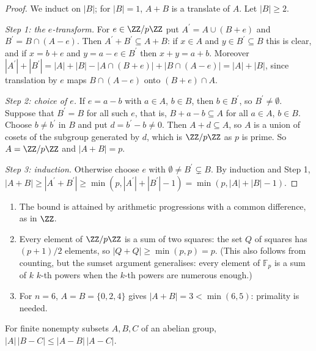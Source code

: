 \begin{proof}
We induct on $|B|$; for $|B| = 1$, $A + B$ is a translate of $A$. Let $|B| \geq 2$.

\emph{Step 1: the $e$-transform.} For $e \in \ZZ/p\ZZ$ put $A^{\prime} = A \cup (B + e)$ and $B^{\prime} = B \cap (A - e)$. Then $A^{\prime} + B^{\prime} \subseteq A + B$: if $x \in A$ and $y \in B^{\prime} \subseteq B$ this is clear, and if
$x = b + e$ and $y = a - e \in B^{\prime}$ then $x + y = a + b$. Moreover $|A^{\prime}| + |B^{\prime}| = |A| + |B| - |A \cap (B + e)| + |B \cap (A - e)| = |A| + |B|$, since translation by $e$ maps $B \cap (A - e)$ onto
$(B + e) \cap A$.

\emph{Step 2: choice of $e$.} If $e = a - b$ with $a \in A$, $b \in B$, then $b \in B^{\prime}$, so $B^{\prime} \neq \emptyset$. Suppose that $B^{\prime} = B$ for all such $e$, that is, $B + a - b \subseteq A$ for all $a \in A$, $b \in B$.
Choose $b \neq b^{\prime}$ in $B$ and put $d = b^{\prime} - b \neq 0$. Then $A + d \subseteq A$, so $A$ is a union of cosets of the subgroup generated by $d$, which is $\ZZ/p\ZZ$ as $p$ is prime. So $A = \ZZ/p\ZZ$
and $|A + B| = p$.

\emph{Step 3: induction.} Otherwise choose $e$ with $\emptyset \neq B^{\prime} \subsetneq B$. By induction and Step 1,
$|A + B| \geq |A^{\prime} + B^{\prime}| \geq \min(p, |A^{\prime}| + |B^{\prime}| - 1) = \min(p, |A| + |B| - 1)$.
\end{proof}

\begin{example}\label{additive-number-theory:example-cauchy-davenport}
\begin{enumerate}
\item The bound is attained by arithmetic progressions with a common difference, as in $\ZZ$.
\item Every element of $\ZZ/p\ZZ$ is a sum of two squares: the set $Q$ of squares has $(p + 1)/2$ elements, so $|Q + Q| \geq \min(p, p) = p$. (This also follows from counting, but the sumset argument
generalises: every element of $\mathbb{F}_p$ is a sum of $k$ $k$-th powers when the $k$-th powers are numerous enough.)
\item For $n = 6$, $A = B = \{0, 2, 4\}$ gives $|A + B| = 3 < \min(6, 5)$: primality is needed.
\end{enumerate}
\end{example}

\begin{proposition}\label{additive-number-theory:proposition-ruzsa}
For finite nonempty subsets $A, B, C$ of an abelian group, $|A|\,|B - C| \leq |A - B|\,|A - C|$.
\end{proposition}

